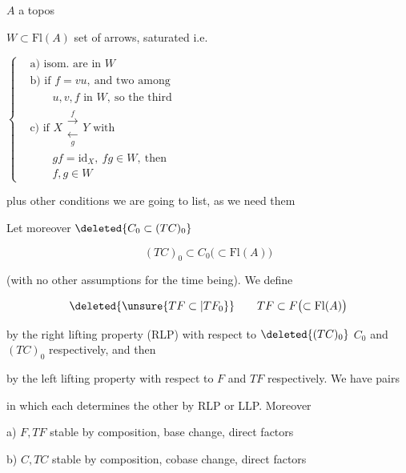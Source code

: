 

$A$ a topos

$W\subset\mathrm{Fl}(A)$ set of arrows,  saturated i.e.

$\left\{\begin{aligned}
&\text{a) isom. are in }W\\
&\text{b) if }f=vu,\ \text{and two among}\\
&\qquad u,v,f\text{ in }W,\ \text{so the third}\\
&\text{c) if }X \mathrel{\substack{\xrightarrow{f}\\[-.6ex]\xleftarrow[g]{}}}Y\text{ with}\\
&\qquad gf=\mathrm{id}_X,\ fg\in W,\ \text{then}\\
&\qquad f,g\in W
\end{aligned}\right.$

plus other conditions we are going to list, as we need them

 Let moreover $\deleted{C_0\subset(TC)_0}$

\[
(TC)_0\subset C_0\bigl(\subset\mathrm{Fl}(A)\bigr)
\]

(with no other assumptions for the time being). We define


\[
\deleted{\unsure{TF\subset|TF_0}}\qquad TF\subset F\bigl(\subset\mathrm{Fl}(A)\bigr)
\]

by the right lifting property (RLP) with respect to $\deleted{(TC)_0}$ $C_0$ and $(TC)_0$ respectively, and then


by the  left lifting property  with respect to $F$ and $TF$ respectively. We have pairs


in which each  determines the other by RLP  or LLP.  Moreover

a) $F,TF$ stable by composition, base change, direct factors

b) $C,TC$ stable by composition, cobase change, direct factors

